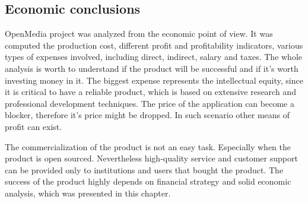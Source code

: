 \subsection{Economic conclusions}
OpenMedia project was analyzed from the economic point of view. It was computed the production cost, different profit and profitability indicators, various types of expenses involved, including direct, indirect, salary and taxes. The whole analysis is worth to understand if the product will be successful and if it's worth investing money in it. The biggest expense represents the intellectual equity, since it is critical to have a reliable product, which is based on extensive research and professional development techniques. The price of the application can become a blocker, therefore it's price might be dropped. In such scenario other means of profit can exist.

The commercialization of the product is not an easy task. Especially when the product is open sourced. Nevertheless high-quality service and customer support can be provided only to institutions and users that bought the product. The success of the product highly depends on financial strategy and solid economic analysis, which was presented in this chapter.
